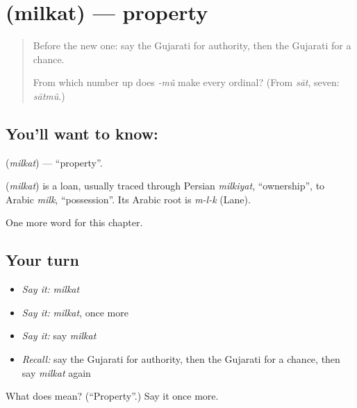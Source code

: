 \section[\texorpdfstring{\gu{મિલકત} (milkat)}{મિલકત (milkat)}]{ (milkat) — property}

\label{lesson:GU-C103-milkat}



\begin{quote}
Before the new one: say the Gujarati for authority, then the Gujarati for a chance.

From which number up does \emph{-mũ} make every ordinal? (From \emph{sāt}, seven: \emph{sātmũ}.)
\end{quote}

\subsection*{You'll want to know: }
\textbf{} (\emph{milkat}) — \textquotedblleft{}property\textquotedblright{}.

\begin{cousinweb}
\textbf{} (\emph{milkat}) is a loan, usually traced through Persian \emph{milkiyat}, \textquotedblleft{}ownership\textquotedblright{}, to Arabic \emph{milk}, \textquotedblleft{}possession\textquotedblright{}. Its Arabic root is \emph{m-l-k} (Lane).
\end{cousinweb}

\begin{grammarlens}[title={What you've built}]
One more word for this chapter.
\end{grammarlens}

\subsection*{Your turn}
\begin{itemize}
\raggedright
  \item \emph{Say it:} \emph{milkat}
  \item \emph{Say it:} \emph{milkat}, once more
  \item \emph{Say it:} say \emph{milkat}
  \item \emph{Recall:} say the Gujarati for authority, then the Gujarati for a chance, then say \emph{milkat} again
\end{itemize}

\begin{tcolorbox}[breakable,colback=teal!4,colframe=teal!35!black,title={Before you move on}]
What does  mean? (\textquotedblleft{}Property\textquotedblright{}.) Say it once more.
\end{tcolorbox}

